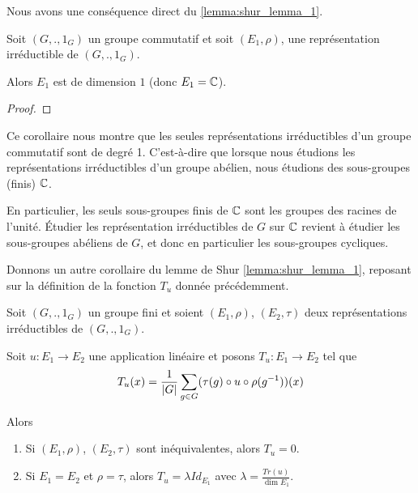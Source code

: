 Nous avons une conséquence direct du \ref{lemma:shur_lemma_1}.

\begin{corollary}
	Soit $(G, ., 1_{G})$ un groupe commutatif et soit $(E_{1},
	\rho)$,
	une représentation irréductible de $(G, ., 1_{G})$.

	Alors $E_{1}$ est de dimension $1$ (donc $E_{1} = \mathbb{C}$).
\end{corollary}

\ifdefined\outputproof
\begin{proof}

\end{proof}
\fi

Ce corollaire nous montre que les seules représentations irréductibles d'un
groupe commutatif sont de degré 1. C'est-à-dire que lorsque nous étudions les
représentations irréductibles d'un groupe abélien, nous étudions des
sous-groupes (finis) $\mathbb{C}$.

En particulier, les seuls sous-groupes finis de $\mathbb{C}$ sont les groupes des
racines de l'unité. Étudier les représentation irréductibles de $G$ sur
$\mathbb{C}$ revient à étudier les sous-groupes abéliens de $G$, et donc en
particulier les sous-groupes cycliques.

Donnons un autre corollaire du lemme de Shur \ref{lemma:shur_lemma_1}, reposant
sur la définition de la fonction $T_{u}$ donnée précédemment.

\begin{corollary}
	Soit $(G, ., 1_{G})$ un groupe fini et soient $(E_{1},
	\rho)$,
	$(E_{2}, \tau)$
	deux représentations irréductibles de $(G, ., 1_{G})$.

	Soit $u : E_{1} \rightarrow E_{2}$ une application linéaire et
	posons $T_{u} : E_{1}  \rightarrow E_{2}$ tel que
	\begin{equation}
		T_{u}(x) = \frac{1}{|G|} \sum_{g \in G} (\tau(g) \circ u \circ
		\rho(g^{-1})) (x)
	\end{equation}

	Alors
	\begin{enumerate}
		\item Si $(E_{1}, \rho)$,
	$(E_{2}, \tau)$ sont inéquivalentes,
	alors $T_{u} = 0$.
		\item Si $E_{1} = E_{2}$ et $\rho = \tau$, alors $T_{u} = \lambda
			Id_{E_{1}}$ avec $\lambda = \frac{Tr(u)}{\dim{E_{1}}}$.
	\end{enumerate}
\end{corollary}

